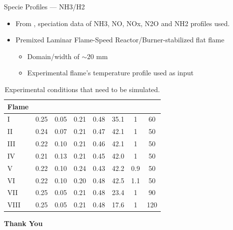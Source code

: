 \documentclass[11pt]{beamer}
\begin{document}
\begin{frame}{Specie Profiles --- NH3/H2}
	\begin{itemize}
		\item From \cite{alturaifiShocktubeStudyNH32023}, speciation data of NH3, NO, NOx, N2O and NH2 profiles used.
		\item Premixed Laminar Flame-Speed Reactor/Burner-stabilized flat flame
		\begin{itemize}
			\item Domain/width of $\sim20$ mm
			\item Experimental flame's temperature profile used as input
		\end{itemize}
	\end{itemize}
	\begin{table}
		\caption{Experimental conditions that need to be simulated. }
		\centering
		\small
		\setlength{\tabcolsep}{3pt}
		\begin{tabularx}{\textwidth}{@{} l *{7}{C} @{}}
		\toprule
		Flame &  &  &  &  &  & \text{$\Phi$} &  \\ 
		\midrule
		I    & 0.25 & 0.05 & 0.21 & 0.48 & 35.1 & 1   & 60  \\
		II   & 0.24 & 0.07 & 0.21 & 0.47 & 42.1 & 1   & 50  \\
		III  & 0.22 & 0.10 & 0.21 & 0.46 & 42.1 & 1   & 50  \\
		IV   & 0.21 & 0.13 & 0.21 & 0.45 & 42.0 & 1   & 50  \\
		V    & 0.22 & 0.10 & 0.24 & 0.43 & 42.2 & 0.9 & 50  \\
		VI   & 0.22 & 0.10 & 0.20 & 0.48 & 42.5 & 1.1 & 50  \\
		VII  & 0.25 & 0.05 & 0.21 & 0.48 & 23.4 & 1   & 90  \\
		VIII & 0.25 & 0.05 & 0.21 & 0.48 & 17.6 & 1   & 120 \\
		\bottomrule
		\end{tabularx}
	\end{table}
\end{frame}

\begin{frame}[plain] %
    \centering
	\Huge \textbf{Thank You}
\end{frame}   
\end{document}
